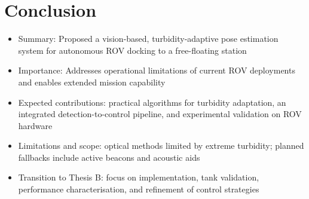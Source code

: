 \section{Conclusion}

\begin{itemize}
    \item Summary: Proposed a vision-based, turbidity-adaptive pose estimation system for autonomous ROV docking to a free-floating station
    \item Importance: Addresses operational limitations of current ROV deployments and enables extended mission capability
    \item Expected contributions: practical algorithms for turbidity adaptation, an integrated detection-to-control pipeline, and experimental validation on ROV hardware
    \item Limitations and scope: optical methods limited by extreme turbidity; planned fallbacks include active beacons and acoustic aids
    \item Transition to Thesis B: focus on implementation, tank validation, performance characterisation, and refinement of control strategies
\end{itemize}